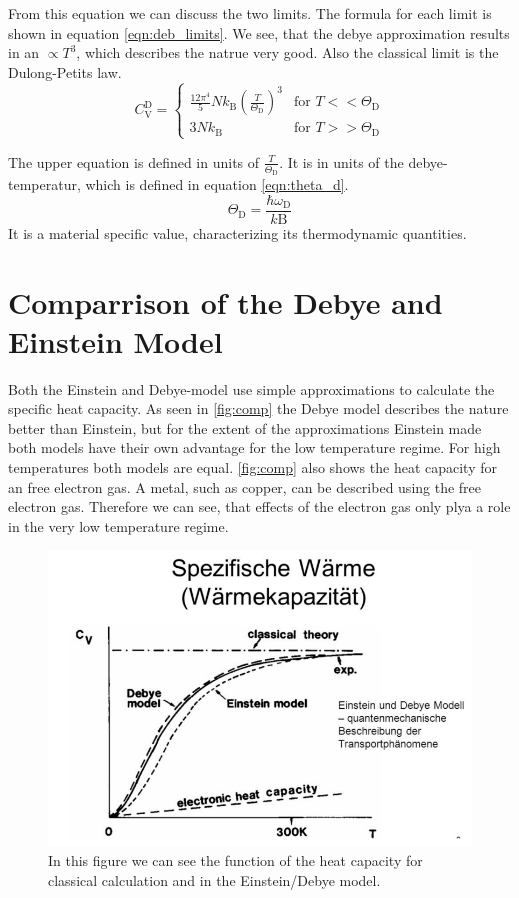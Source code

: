 From this equation we can discuss the two limits. The formula for each limit is shown in equation \ref{eqn:deb_limits}. We see, that the debye approximation results in an $\propto T^3$, 
which describes the natrue very good. Also the classical limit is the Dulong-Petits law.
\begin{equation}
    \label{eqn:deb_limits}
    C_{\mathrm{V}}^{\mathrm{D}} =
    \begin{cases}
        \frac{12\pi^4}{5}Nk_\mathrm{B}\left(\frac{T}{\Theta_\mathrm{D}}\right)^3 & \text{for } T <<  \Theta_\mathrm{D} \\
        3Nk_\mathrm{B} & \text{for } T >>  \Theta_\mathrm{D}
    \end{cases}
\end{equation}

The upper equation is defined in units of $\frac{T}{\Theta_\mathrm{D}}$. It is in units of the debye-temperatur, which is defined in equation \ref{eqn:theta_d}.
\begin{equation}
    \label{eqn:theta_d}
    \Theta_\mathrm{D} = \frac{\hbar\omega_\mathrm{D}}{k\mathrm{B}}
\end{equation} 
 It is a material specific value, characterizing its thermodynamic quantities.
\section{Comparrison of the Debye and Einstein Model}
\label{sec:comp_DE}
Both the Einstein and Debye-model use simple approximations to calculate the specific heat capacity. As seen in \autoref{fig:comp} the Debye model describes the nature better than Einstein, 
but for the extent of the approximations Einstein made both models have their own advantage for the low temperature regime. For high temperatures both models are equal. \autoref{fig:comp}
also shows the heat capacity for an free electron gas. A metal, such as copper, can be described using the free electron gas. Therefore we can see, that effects of the electron gas 
only plya a role in the very low temperature regime.
\begin{figure}
    \centering
    \includegraphics[scale=0.4]{content/V47_pictures/comp.PNG}
    \caption{In this figure we can see the function of the heat capacity for classical calculation and in the Einstein/Debye model.}
    \label{fig:comp}
\end{figure}
